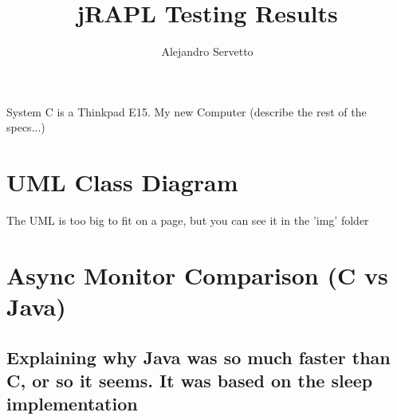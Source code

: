 \documentclass{article}
\title{jRAPL Testing Results}
\author{Alejandro Servetto}
\begin{document}
\maketitle

System C is a Thinkpad E15. My new Computer (describe the rest of the specs...)

\section{UML Class Diagram}
    The UML is too big to fit on a page, but you can see it in the 'img' folder

\section{Async Monitor Comparison (C vs Java)}

\subsection{Explaining why Java was so much faster than C, or so it seems. It was based on the sleep implementation}
\end{document}
